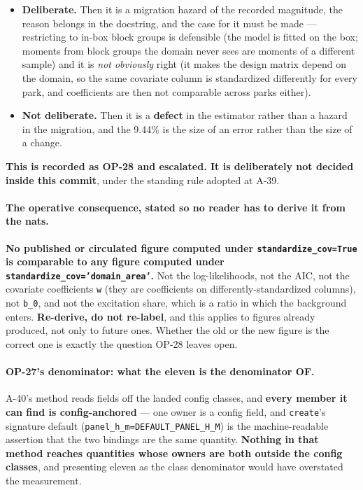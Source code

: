 \documentclass[
  10pt,
]{article}
\providecommand{\tightlist}{%
  \setlength{\itemsep}{0pt}\setlength{\parskip}{0pt}}
\begin{document}
\begin{itemize}
\tightlist
\item \textbf{Deliberate.} Then it is a migration hazard of the recorded magnitude, the reason belongs in the docstring, and the case for it must be made --- restricting to in-box block groups is defensible (the model is fitted on the box; moments from block groups the domain never sees are moments of a different sample) and it is \emph{not obviously} right (it makes the design matrix depend on the domain, so the same covariate column is standardized differently for every park, and coefficients are then not comparable across parks either).
\item \textbf{Not deliberate.} Then it is a \textbf{defect} in the estimator rather than a hazard in the migration, and the 9.44\% is the size of an error rather than the size of a change.
\end{itemize}

\textbf{This is recorded as OP-28 and escalated. It is deliberately not decided inside this commit}, under the standing rule adopted at A-39.

\paragraph{The operative consequence, stated so no reader has to derive it from the nats.}
\textbf{No published or circulated figure computed under \texttt{standardize\_cov=True} is comparable to any figure computed under \texttt{standardize\_cov='domain\_area'}.} Not the log-likelihoods, not the AIC, not the covariate coefficients \texttt{w} (they are coefficients on differently-standardized columns), not \texttt{b\_0}, and not the excitation share, which is a ratio in which the background enters. \textbf{Re-derive, do not re-label}, and this applies to figures already produced, not only to future ones. Whether the old or the new figure is the correct one is exactly the question OP-28 leaves open.

\paragraph{OP-27's denominator: what the eleven is the denominator OF.}
A-40's method reads fields off the landed config classes, and \textbf{every member it can find is config-anchored} --- one owner is a config field, and \texttt{create}'s signature default (\texttt{panel\_h\_m=DEFAULT\_PANEL\_H\_M}) is the machine-readable assertion that the two bindings are the same quantity. \textbf{Nothing in that method reaches quantities whose owners are both outside the config classes}, and presenting eleven as the class denominator would have overstated the measurement.
\end{document}
